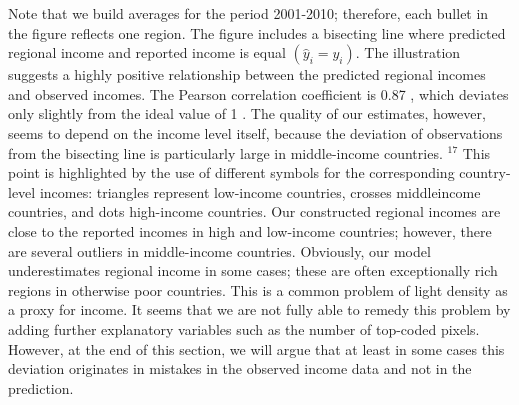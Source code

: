 \documentclass[10pt]{article}
\begin{document}
Note that we build averages for the period 2001-2010; therefore, each bullet in the figure reflects one region. The figure includes a bisecting line where predicted regional income and reported income is equal $\left(\hat{y}_{i}=y_{i}\right)$. The illustration suggests a highly positive relationship between the predicted regional incomes and observed incomes. The Pearson correlation coefficient is 0.87 , which deviates only slightly from the ideal value of 1 . The quality of our estimates, however, seems to depend on the income level itself, because the deviation of observations from the bisecting line is particularly large in middle-income countries. ${ }^{17}$ This point is highlighted by the use of different symbols for the corresponding country-level incomes: triangles represent low-income countries, crosses middleincome countries, and dots high-income countries. Our constructed regional incomes are close to the reported incomes in high and low-income countries; however, there are several outliers in middle-income countries. Obviously, our model underestimates regional income in some cases; these are often exceptionally rich regions in otherwise poor countries. This is a common problem of light density as a proxy for income. It seems that we are not fully able to remedy this problem by adding further explanatory variables such as the number of top-coded pixels. However, at the end of this section, we will argue that at least in some cases this deviation originates in mistakes in the observed income data and not in the prediction.
\end{document}
